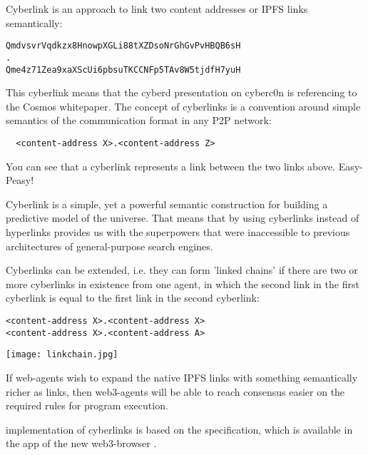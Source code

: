 \documentclass[8pt,oneside]{amsart}
\newcommand{\linkred}[2]{\href{#1}{\color{red}{#2}}}
\newcommand{\code}[1]{{\PlayBold #1}}
\newenvironment{Figure}
  {\par\medskip\noindent\minipage{\linewidth}}
  {\endminipage\par\medskip}
\begin{document}
\begin{Abstract}
\code{Cyberlink} is an approach to link two content addresses or \code{IPFS links} semantically:

\begin{lstlisting}
QmdvsvrVqdkzx8HnowpXGLi88tXZDsoNrGhGvPvHBQB6sH
.
Qme4z71Zea9xaXScUi6pbsuTKCCNFp5TAv8W5tjdfH7yuH
\end{lstlisting}

This cyberlink means that the cyberd presentation on cyberc0n is referencing to the Cosmos whitepaper. The concept of cyberlinks is a convention around simple semantics of the communication format in any P2P network:

\begin{lstlisting}
  <content-address X>.<content-address Z>
\end{lstlisting}

You can see that a cyberlink represents a link between the two links above. Easy-Peasy!

Cyberlink is a simple, yet a powerful semantic construction for building a predictive model of the universe. That means that by using cyberlinks instead of hyperlinks provides us with the superpowers that were inaccessible to previous architectures of general-purpose search engines.

Cyberlinks can be extended, i.e. they can form 'linked chains' if there are two or more cyberlinks in existence from one agent, in which the second link in the first cyberlink is equal to the first link in the second cyberlink:

\begin{lstlisting}
<content-address X>.<content-address X>
<content-address X>.<content-address A>
\end{lstlisting}

\begin{Figure}
    \centering
    \texttt{[image: linkchain.jpg]}
\end{Figure}

If web-agents wish to expand the native \code{IPFS links} with something semantically richer as
\linkred{https://github.com/cybercongress/cyb/blob/dev/docs/dura.md}{DURA}
links, then web3-agents will be able to reach consensus easier on the required rules for program execution.

\linkred{https://github.com/cybercongress/cyberd}{cyber} implementation of \code{cyberlinks} is based on the \linkred{https://github.com/cybercongress/cyb/blob/dev/docs/dura.md}{DURA} specification, which is available in the \linkred{https://github.com/cybercongress/.cyber}{.cyber} app of the new web3-browser \linkred{https://github.com/cybercongress/cyb}{cyb}.


\end{Abstract}
\end{document}

